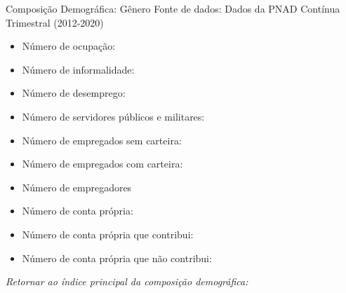 \begin{frame}[label=_composicao_demografica_genero]{Composição Demográfica: Gênero}
{\footnotesize Fonte de dados: Dados da PNAD Contínua Trimestral (2012-2020)}
\begin{itemize}
\item{Número de ocupação: \hyperlink{_composicao_demografica_genero_n_de_ocupacao}{}}
\item{Número de informalidade: \hyperlink{_composicao_demografica_genero_n_de_informalidade}{}}
\item{Número de desemprego: \hyperlink{_composicao_demografica_genero_n_de_desemprego}{}}
\item{Número de servidores públicos e militares: \hyperlink{_composicao_demografica_genero_n_militar}{}}
\item{Número de empregados sem carteira: \hyperlink{_composicao_demografica_genero_n_empregadoSC}{}}
\item{Número de empregados com carteira: \hyperlink{_composicao_demografica_genero_n_empregadoCC}{}}
\item{Número de empregadores \hyperlink{_composicao_demografica_genero_n_empregador}{}}
\item{Número de conta própria: \hyperlink{_composicao_demografica_genero_n_cpropria}{}}
\item{Número de conta própria que contribui: \hyperlink{_composicao_demografica_genero_n_cpropriaC}{}}
\item{Número de conta própria que não contribui: \hyperlink{_composicao_demografica_genero_n_cpropriaNc}{}}
\end{itemize}

\begin{small}
\textit{Retornar ao índice principal da composição demográfica: \hyperlink{_composicao_demografica}{} }
\end{small}

\end{frame}

